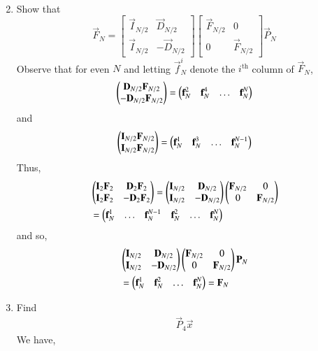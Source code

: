 \documentclass[journal,12pt,twocolumn]{IEEEtran}
\renewcommand\thesection{\arabic{section}}
\begin{document}
\begin{enumerate}[label=\arabic*.,ref=\thesection.\theenumi]
\begin{align}
\end{align}
\item Show that 
\begin{equation}
\vec{F}_{N}=
\begin{bmatrix}
\vec{I}_{N/2} & \vec{D}_{N/2} \\
\vec{I}_{N/2} & -\vec{D}_{N/2}
\end{bmatrix}
\begin{bmatrix}
\vec{F}_{N/2} & 0 \\
0 & \vec{F}_{N/2}
\end{bmatrix}
\vec{P}_{N}
\end{equation}
\solution  Observe that for even $N$ and letting $\vec{f}_N^i$ denote the $i^{\text{th}}$ column of $\vec{F}_N$, 
\begin{align}
	\begin{pmatrix}\textbf{D}_{N/2}\textbf{F}_{N/2} \\ -\textbf{D}_{N/2}\textbf{F}_{N/2}\end{pmatrix} = \begin{pmatrix}\textbf{f}_N^{2} & \textbf{f}_N^{4} & \ldots & \textbf{f}_N^{N}\end{pmatrix}
\end{align}
and
\begin{align}
	\begin{pmatrix}\textbf{I}_{N/2}\textbf{F}_{N/2} \\ \textbf{I}_{N/2}\textbf{F}_{N/2}\end{pmatrix} = \begin{pmatrix}\textbf{f}_N^{1} & \textbf{f}_N^{3} & \ldots & \textbf{f}_N^{N - 1}\end{pmatrix}
\end{align}
Thus,
\begin{align}
	&\begin{pmatrix}\textbf{I}_2\textbf{F}_2 & \textbf{D}_2\textbf{F}_2 \\ \textbf{I}_2\textbf{F}_2 & -\textbf{D}_2\textbf{F}_2\end{pmatrix} = \begin{pmatrix}\textbf{I}_{N/2} & \textbf{D}_{N/2} \\ \textbf{I}_{N/2} & -\textbf{D}_{N/2}\end{pmatrix}\begin{pmatrix}\textbf{F}_{N/2} & 0 \\ 0 & \textbf{F}_{N/2}\end{pmatrix} \nonumber \\
	&= \begin{pmatrix}\textbf{f}_N^{1} & \ldots & \textbf{f}_N^{N - 1} & \textbf{f}_N^{2} & \ldots & \textbf{f}_N^{N}\end{pmatrix}
\end{align}
and so,
\begin{align}
	&\begin{pmatrix}\textbf{I}_{N/2} & \textbf{D}_{N/2} \\ \textbf{I}_{N/2} & -\textbf{D}_{N/2}\end{pmatrix}\begin{pmatrix}\textbf{F}_{N/2} & 0 \\ 0 & \textbf{F}_{N/2}\end{pmatrix}\textbf{P}_{N} \nonumber \\
	&= \begin{pmatrix}\textbf{f}_N^{1} & \textbf{f}_N^{2} & \ldots & \textbf{f}_N^{N}\end{pmatrix} = \textbf{F}_N
\end{align}
\item Find 
    \begin{align}
	     \vec{P}_4 \vec{x}
    \end{align}
\solution  We have,
\begin{align}

\end{align}
\end{enumerate}
\end{document}
